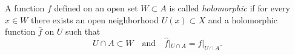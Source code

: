 A function $f$ defined on an open set $W \subset A$ is called \textit{holomorphic} if for every $x \in W$ there exists an open neighborhood $U(x) \subset X$ and a holomorphic function $\hat{f}$ on $U$ such that
$$U \cap A \subset W \quad\text{and}\quad \hat{f}|_{U \cap A} = f|_{U \cap A}.$$
